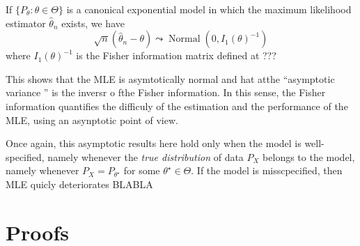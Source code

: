 \documentclass[
	fontsize=11pt, %
	twoside=false, %
	numbers=noenddot, %
]{kaobook}
\DeclareMathOperator{\nor}{Normal}
\newcommand{\wh}{\widehat}
\newcommand{\gosto}{\leadsto}
\begin{document}
\begin{theorem}
	If $\{ P_\theta : \theta \in \Theta \}$ is a canonical exponential model in which the maximum likelihood estimator $\wh \theta_n$ exists, we have
	\begin{equation*}
		\sqrt n (\wh \theta_n - \theta) \gosto \nor(0, I_1(\theta)^{-1})
	\end{equation*}
	where $I_1(\theta)^{-1}$ is the Fisher information matrix defined at ???
\end{theorem}
This shows that the MLE is asymtotically normal and hat atthe ``asymptotic variance '' is the inversr o fthe Fisher information.
In this sense, the Fisher information quantifies the difficuly of the estimation and the performance of the MLE, using an asynptotic point of view.

Once again, this asymptotic results here hold only when the model is well-specified, namely whenever the \emph{true distribution} of data $P_X$ belongs to the model, namely whenever $P_X = P_{\theta^\star}$ for some $\theta^\star \in \Theta$.
If the model is misscpecified, then MLE quicly deteriorates BLABLA

\section{Proofs} %
\label{sec:proofs_chap_mle}













% 



\end{document}
